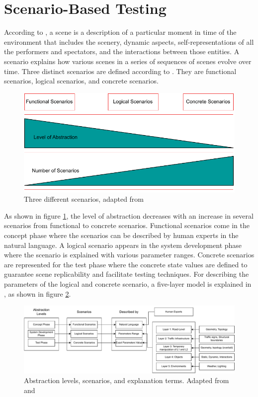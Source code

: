 \section{Scenario-Based Testing}
According to \parencite{def_scene}, a scene is a description of a particular moment in time of the environment that includes the scenery, dynamic aspects, self-representations of all the performers and spectators, and the interactions between those entities. A scenario explains how various scenes in a series of sequences of scenes evolve over time. Three distinct scenarios are defined according to \parencite{menzel2018scenarios}. They are functional scenarios, logical scenarios, and concrete scenarios. 

\begin{figure}[htbp]
    \centering
    \includegraphics[width=0.75\linewidth]{97_graphics/related_work/three_different_scenarios.pdf}
    \caption{Three different scenarios, adapted from \parencite{menzel2018scenarios}}
    \label{fig:related_work-3scenarios}
\end{figure}

As shown in figure \ref{fig:related_work-3scenarios}, the level of abstraction decreases with an increase in several scenarios from functional to concrete scenarios. Functional scenarios come in the concept phase where the scenarios can be described by human experts in the natural language. A logical scenario appears in the system development phase where the scenario is explained with various parameter ranges. Concrete scenarios are represented for the test phase where the concrete state values are defined to guarantee scene replicability and facilitate testing techniques. For describing the parameters of the logical and concrete scenario, a five-layer model is explained in \parencite{bagschik2018ontology}, as shown in figure \ref{fig:related_work-5layer_model}.

\begin{figure}[htbp]
    \centering
    \includegraphics[width=1\linewidth]{97_graphics/related_work/scenario_based_testing.pdf}
    \caption{Abstraction levels, scenarios, and explanation terms. Adapted from \parencite{bagschik2018ontology} and \parencite{menzel2018scenarios}
    }
    \label{fig:related_work-5layer_model}
\end{figure}

